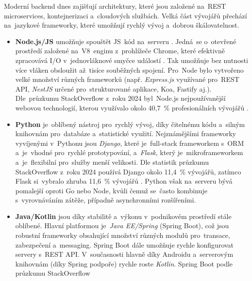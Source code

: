 Moderní backend dnes zajišťují architektury, které jsou založené na~REST
microservices, kontejnerizaci a~cloudových službách. Velká část vývojářů
přechází na~jazykové frameworky, které umožňují rychlý vývoj a~dobrou
škálovatelnost.

\begin{itemize}
    \item \textbf{Node.js/JS} umožňuje spouštět JS~kód na~serveru
        \cite{YHVfLHsNlUItkF6G, kbr6yxw1ew4wJS2e}. %
        Jedná~se o~otevřené prostředí založené na~V8~enginu z~prohlížeče
        Chrome, které efektivně zpracovává I/O v~jednovláknové smyčce
        událostí \cite{YHVfLHsNlUItkF6G,kbr6yxw1ew4wJS2e}. %
        Tak umožňuje bez nutnosti více vláken obsloužit až~tisíce
        souběžných spojení. Pro~Node bylo vytvořeno velké množství
        různých frameworků (např. \emph{Express.js} využívané pro~REST API,
        \emph{NestJS} určené pro~strukturované aplikace, Koa, Fastify aj.).
        Dle~průzkumu StackOverflow z~roku 2024 byl~Node.js nejpoužívanější
        webovou technologií, kterou využívalo okolo 40,7~\% profesionálních
        vývojářů \cite{YHVfLHsNlUItkF6G,w6F4OYb0neliWLGP}. %
    \item \textbf{Python} je~oblíbený nástroj pro~rychlý vývoj, díky
        čitelnému kódu a~silným knihovnám pro~databáze a~statistické
        využití. Nejznámějšími frameworky vyvíjenými v~Pythonu jsou
        \emph{Django}, které je~full-stack frameworkem s~ORM a~je~vhodné
        pro~rychlé prototypování, a~\emph{Flask}, který je~mikroframeworkem
        a~je~flexibilní pro~služby menší velikosti. Dle statistik průzkumu
        StackOverflow z~roku 2024 používá Django okolo 11,4~\% vývojářů,
        zatímco Flask si~vybralo zhruba 11,6~\% vývojářů
        \cite{YHVfLHsNlUItkF6G,w6F4OYb0neliWLGP}. %
        Python však na~serveru bývá pomalejší oproti Go nebo Node, kvůli
        čemuž se~často kombinuje s~vyrovnáváním zátěže, případně
        asynchronními rozšířeními.
    \item \textbf{Java/Kotlin} jsou díky stabilitě a~výkonu v~podnikovém
        prostředí stále oblíbené. Hlavní platformou je~\emph{Java EE/Spring}
        (Spring Boot), což jsou robustní frameworky obsahující množství
        různých modulů pro~transace, zabezpečení a~messaging. Spring Boot
        dále umožňuje rychle konfigurovat servery s~REST API. V~současnosti
        hlavně díky Androidu a~serverovým knihovnám (díky Spring podpoře)
        rychle roste \emph{Kotlin}. Spring Boot podle průzkumu StackOverflow

\end{itemize}
